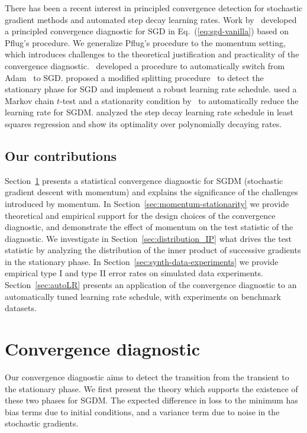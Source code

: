 \documentclass[conference]{IEEEtran}
\begin{document}
There has been a recent interest in principled convergence detection for stochastic gradient methods and automated step decay learning rates.
Work by~\cite{Proc:Chee_AISTATS18} developed a principled convergence diagnostic for  SGD in Eq.~(\ref{eq:sgd-vanilla}) based on Pflug's procedure. We generalize Pflug's procedure to the momentum setting, which introduces challenges to the theoretical justification and practicality of the convergence diagnostic.~\cite{keskar2017improving} developed a procedure to automatically switch from Adam~\cite{Proc:Kingma_ICLR15} to SGD. \cite{matteo2019JSM} proposed a modified splitting procedure~\cite{su2018uncertainty} to detect the stationary phase for SGD and implement a robust learning rate schedule. \cite{Proc:Lang_NeurIPS19} used a Markov chain $t$-test and a stationarity condition by~\cite{Proc:Yaida_ICLR19} to automatically reduce the learning rate for SGDM. \cite{Proc:Ge_NeurIPS19} analyzed the step decay learning rate schedule in least squares regression and show its optimality over polynomially decaying rates.


\subsection{Our contributions}

Section~\ref{sec:sgd-vanilla} presents a statistical convergence diagnostic for SGDM (stochastic gradient descent with momentum) and explains the significance of the challenges introduced by momentum. In Section~\ref{sec:momentum-stationarity} we provide theoretical and empirical support for the design choices of the convergence diagnostic, and demonstrate the effect of momentum on the test statistic of the diagnostic.
We investigate in Section~\ref{sec:distribution_IP} 
 what drives the test statistic by analyzing the distribution of the inner product of successive gradients in the stationary phase. In Section~\ref{sec:synth-data-experiments} we provide empirical type I and type II error rates on simulated data experiments. Section~\ref{sec:autoLR} presents an application of the convergence diagnostic to an automatically tuned learning rate schedule, with experiments on benchmark datasets.

\section{Convergence diagnostic}\label{sec:sgd-vanilla}

Our convergence diagnostic aims to detect the transition from the transient to the stationary phase. We first present the theory which supports the existence of these two phases for SGDM.
The expected difference in loss to the minimum has bias terms due to initial conditions, and a variance term due to noise in the stochastic gradients.
\end{document}
